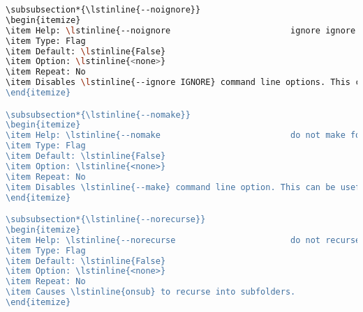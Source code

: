 \begin{snugshade}
\begin{lstlisting}[language=bash]
\subsubsection*{\lstinline{--noignore}}
\begin{itemize}
\item Help: \lstinline{--noignore                        ignore ignore options}
\item Type: Flag
\item Default: \lstinline{False}
\item Option: \lstinline{<none>}
\item Repeat: No
\item Disables \lstinline{--ignore IGNORE} command line options. This can be useful if there's a default ignore in \lstinline{arguments}.
\end{itemize}

\subsubsection*{\lstinline{--nomake}}
\begin{itemize}
\item Help: \lstinline{--nomake                          do not make folders}
\item Type: Flag
\item Default: \lstinline{False}
\item Option: \lstinline{<none>}
\item Repeat: No
\item Disables \lstinline{--make} command line option. This can be useful if that arument is on by default in \lstinline{arguments}.
\end{itemize}

\subsubsection*{\lstinline{--norecurse}}
\begin{itemize}
\item Help: \lstinline{--norecurse                       do not recurse into subfolders}
\item Type: Flag
\item Default: \lstinline{False}
\item Option: \lstinline{<none>}
\item Repeat: No
\item Causes \lstinline{onsub} to recurse into subfolders.
\end{itemize}


\end{lstlisting}
\end{snugshade}

